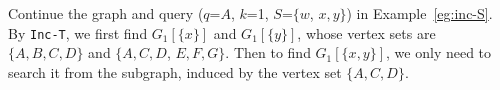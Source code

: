 \begin{example}
\label{eg:inc-T}
Continue the graph and query ($q$=$A$, $k$=1, $S$=$\{w$, $x,y\}$) in Example~\ref{eg:inc-S}.
By {\tt Inc-T}, we first find $G_1[\{x\}]$ and $G_1[\{y\}]$,
whose vertex sets are $\{A,B,C,D\}$ and $\{A,C,D$, $E,F,G\}$.
Then to find $G_1[\{x,y\}]$, we only need to search it from the subgraph,
induced by the vertex set $\{A,C,D\}$.
\end{example}



